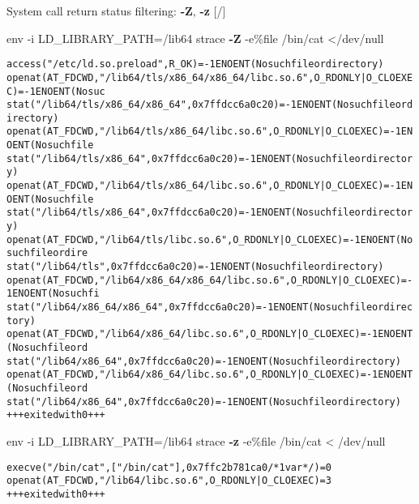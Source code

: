 \documentclass[unicode,aspectratio=169,xcolor={table,dvipsnames,usernames}]{beamer}
\begin{document}
\begin{frame}[fragile]{System call return status filtering: \textbf{-Z}, \textbf{-z} \hfill [\insertframenumber/\inserttotalframenumber]}
\scriptsize
\begin{block}{env -i LD\_LIBRARY\_PATH=/lib64 strace \textbf{-Z} -e\%file /bin/cat </dev/null}
\begin{alltt}
access("/etc/ld.so.preload", R_OK) = -1 ENOENT (No such file or directory)
openat(AT_FDCWD, "/lib64/tls/x86_64/x86_64/libc.so.6", O_RDONLY|O_CLOEXEC) = -1 ENOENT (No suc
stat("/lib64/tls/x86_64/x86_64", 0x7ffdcc6a0c20) = -1 ENOENT (No such file or directory)
openat(AT_FDCWD, "/lib64/tls/x86_64/libc.so.6", O_RDONLY|O_CLOEXEC) = -1 ENOENT (No such file
stat("/lib64/tls/x86_64", 0x7ffdcc6a0c20) = -1 ENOENT (No such file or directory)
openat(AT_FDCWD, "/lib64/tls/x86_64/libc.so.6", O_RDONLY|O_CLOEXEC) = -1 ENOENT (No such file
stat("/lib64/tls/x86_64", 0x7ffdcc6a0c20) = -1 ENOENT (No such file or directory)
openat(AT_FDCWD, "/lib64/tls/libc.so.6", O_RDONLY|O_CLOEXEC) = -1 ENOENT (No such file or dire
stat("/lib64/tls", 0x7ffdcc6a0c20) = -1 ENOENT (No such file or directory)
openat(AT_FDCWD, "/lib64/x86_64/x86_64/libc.so.6", O_RDONLY|O_CLOEXEC) = -1 ENOENT (No such fi
stat("/lib64/x86_64/x86_64", 0x7ffdcc6a0c20) = -1 ENOENT (No such file or directory)
openat(AT_FDCWD, "/lib64/x86_64/libc.so.6", O_RDONLY|O_CLOEXEC) = -1 ENOENT (No such file or d
stat("/lib64/x86_64", 0x7ffdcc6a0c20) = -1 ENOENT (No such file or directory)
openat(AT_FDCWD, "/lib64/x86_64/libc.so.6", O_RDONLY|O_CLOEXEC) = -1 ENOENT (No such file or d
stat("/lib64/x86_64", 0x7ffdcc6a0c20) = -1 ENOENT (No such file or directory)
+++ exited with 0 +++
\end{alltt}
\end{block}
\begin{block}{env -i LD\_LIBRARY\_PATH=/lib64 strace \textbf{-z} -e\%file /bin/cat < /dev/null}
\begin{alltt}
execve("/bin/cat", ["/bin/cat"], 0x7ffc2b781ca0 /* 1 var */) = 0
openat(AT_FDCWD, "/lib64/libc.so.6", O_RDONLY|O_CLOEXEC) = 3
+++ exited with 0 +++
\end{alltt}
\end{block}
\end{frame}
\end{document}
